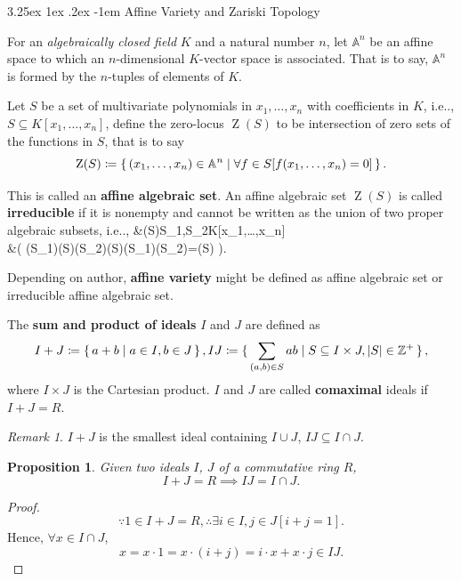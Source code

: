 \documentclass[12pt, letterpaper]{article}
\makeatletter
\newcommand{\inte}{\mathbb{Z}}
\newcommand{\ZZ}{\operatorname{Z}}
\newcommand\ie{i.e\@ifnextchar.{}{.\@}}
\newcommand{\card}[1]{\left\lvert #1 \right\rvert}
\newcommand{\define}{\coloneqq}
\renewcommand{\emptyset}{\varnothing}
\newenvironment{eqlong}{\equation\aligned}{\endaligned\endequation}
\newtheorem{prop}{Proposition}[section]
\renewcommand\paragraph{\@startsection{paragraph}{4}{\z@}%
	{3.25ex \@plus1ex \@minus.2ex}%
	{-1em}%
	{\normalfont\normalsize\bfseries}}
\theoremstyle{definition}
\theoremstyle{remark}
\newtheorem*{rem*}{Remark}
\theoremstyle{definition}
\theoremstyle{plain}
\numberwithin{equation}{section}
\makeatother
\begin{document}
	\paragraph{Affine Variety and Zariski Topology}
	
	\begin{def*}
		For an \textit{algebraically closed field} $K$ and a natural number $n$,
		let $\mathbb{A}^n$ be an affine space 
		to which an $n$-dimensional $K$-vector space is associated.
		That is to say, $\mathbb{A}^n$ is formed by the $n$-tuples of elements of $K$.
		
		Let $S$ be a set of multivariate polynomials in $x_1, \dots, x_n$ with coefficients in $K$,
		\ie, $S \subseteq K[x_1, \dots, x_n]$,
		define the zero-locus $\ZZ(S)$ to be intersection of zero sets
		of the functions in $S$, that is to say
		\[ \ZZ(S)\define \set{(x_1,\dots,x_n) \in \mathbb{A}^n | \forall f \in S [f(x_1,\dots,x_n)=0] }. \]
		
		This is called an \textbf{affine algebraic set}.
		An affine algebraic set $\ZZ(S)$ is called \textbf{irreducible}	if
		it is nonempty and cannot be written as the union of two proper algebraic subsets, \ie,
		\begin{eqlong}
			&\ZZ(S)\ne \emptyset \land \neg\exists S_1,S_2\subseteq K[x_1,\dots,x_n]\\
			&\Big( \ZZ(S_1)\ne \ZZ(S)\land \ZZ(S_2)\ne\ZZ(S)\land\ZZ(S_1)\cup \ZZ(S_2)=\ZZ(S) \Big). \\
		\end{eqlong}
	
		Depending on author, \textbf{affine variety} might be defined as affine algebraic set or irreducible affine algebraic set.
	\end{def*}

	\begin{def*}
		The \textbf{sum and product of ideals} $I$ and $J$ are defined as
		\[ I+J\define\set{a+b|a\in I,b\in J},
		IJ\define\set{\sum_{(a,b)\in S} ab| S\subseteq I\times J,\card{S}\in\inte^+ },
		 \]
		where $I\times J$ is the Cartesian product.
		$I$ and $J$ are called \textbf{comaximal} ideals if $I+J=R$.
	\end{def*}
	\begin{rem*}
		$I+J$ is the smallest ideal containing $I\cup J$, $IJ\subseteq I\cap J$.
	\end{rem*}
	\begin{prop}
		Given two ideals $I$, $J$ of a commutative ring $R$,
		\[ I+J=R\implies IJ=I\cap J. \]
	\end{prop}
	\begin{proof}
		\[ \because 1\in I+J=R, \therefore \exists i\in I, j\in J [i+j=1]. \]
		Hence, $\forall x \in I\cap J$,
		\[ x = x\cdot 1 = x\cdot( i + j)=i\cdot x+ x\cdot j\in IJ. \]
	\end{proof}
\end{document}
